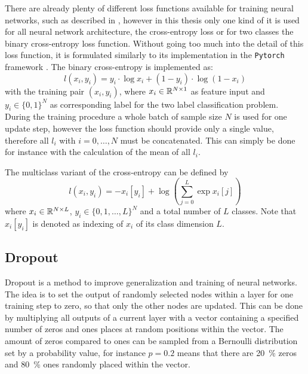 There are already plenty of different loss functions available for training neural networks, such as described in \cite{LeCun2006}, however in this thesis only one kind of it is used for all neural network architecture, the cross-entropy loss or for two classes the binary cross-entropy loss function.
Without going too much into the detail of this loss function, it is formulated similarly to its implementation in the \texttt{Pytorch} framework \cite{Pytorch}.
The binary cross-entropy is implemented as:
\begin{equation}\label{eq:nn_theory_binary_cross_entropy}
  l(x_i, y_i) = y_i \cdot \log x_i + (1 - y_i) \cdot \log (1 - x_i)
\end{equation}
with the training pair $(x_i, y_i)$, where $x_i \in \mathbb{R}^{N \times 1}$ as feature input and $y_i \in \{0, 1\}^N$ as corresponding label for the two label classification problem.
During the training procedure a whole batch of sample size $N$ is used for one update step, however the loss function should provide only a single value, therefore all $l_i$ with $i = 0, \dots, N$ must be concatenated.
This can simply be done for instance with the calculation of the mean of all $l_i$.

The multiclass variant of the cross-entropy can be defined by
\begin{equation}
  l(x_i, y_i) = - x_i[y_i] + \log{\left( \sum_{j=0}^{L} \exp{x_i[j]} \right)}
\end{equation}
where $x_i \in \mathbb{R}^{N \times L}$, $y_i \in \{0, 1, \dots, L\}^N$ and a total number of $L$ classes.
Note that $x_i[y_i]$ is denoted as indexing of $x_i$ of its class dimension $L$. 



\subsection{Dropout}
Dropout \cite{Hinton2012} is a method to improve generalization and training of neural networks.
The idea is to set the output of randomly selected nodes within a layer for one training step to zero, so that only the other nodes are updated.
This can be done by multiplying all outputs of a current layer with a vector containing a specified number of zeros and ones places at random positions within the vector.
The amount of zeros compared to ones can be sampled from a Bernoulli distribution set by a probability value, for instance $p=0.2$ means that there are \SI{20}{\percent} zeros and \SI{80}{\percent} ones randomly placed within the vector.


